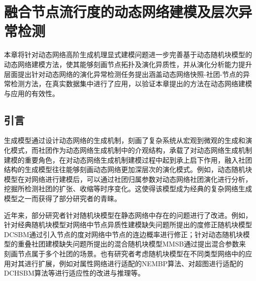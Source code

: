\baselineskip 20pt
\chapter{融合节点流行度的动态网络建模及层次异常检测}
\label{chap:5}

本章将针对动态网络高阶生成机理显式建模问题进一步完善基于动态随机块模型的动态网络建模方法，使其能够刻画节点拓扑及演化异质性，并从演化分析能力提升层面提出针对动态网络的演化异常检测任务提出涵盖动态网络快照-社团-节点的异常检测方法，在真实数据集中进行了应用，以验证本章提出的方法在动态网络建模与应用的有效性。



\section{引言\label{chap5:intro}}

生成模型通过设计动态网络的生成机制，刻画了复杂系统从宏观到微观的生成和演化模式，而社团作为动态网络生成机制中的介观结构，承载了对动态网络生成机制建模的重要角色\cite{ghoshal2021influence}，在对动态网络生成机制建模过程中起到承上启下作用，融入社团结构的生成模型往往能够刻画动态网络更加深层次的演化模式。例如，动态随机块模型在对网络进行建模后，可以通过社团归属参数对动态网络社团演化进行分析，挖掘所检测社团的扩张、收缩等时序变化\cite{yang2011detecting}。这使得该模型成为经典的复杂网络生成模型之一而获得了部分研究者的青睐。

近年来，部分研究者针对随机块模型在静态网络中存在的问题进行了改进。例如，针对经典随机块模型对网络中节点异质性建模缺失问题所提出的度修正随机块模型DCSBM\cite{ma2021determining}通过引入节点的度对网络中节点的连边概率进行修正；针对动态随机块模型的重叠社团建模缺失问题所提出的混合随机块模型MMSB\cite{godoy2016accurate}通过提出混合参数来刻画节点属于多个社团的场景。也有研究者考虑随机块模型在不同类型网络中的应用对其进行扩展，例如对属性网络进行适配的NEMBP算法\cite{he2017joint}、对超图进行适配的DCHSBM算法\cite{10214123}等进行适应性的改进与推理等。


